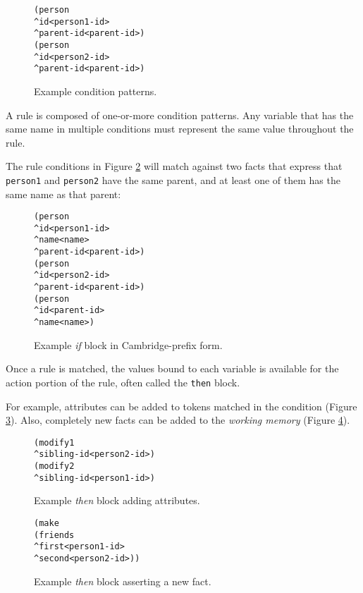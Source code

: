 \documentclass[10pt,twocolumn,letterpaper,colorhighlight]{article}
\newenvironment{codelisting}%
	{\begin{minipage}{250pt}\small\begin{alltt}}%
	{\end{alltt}\end{minipage}}
\begin{document}

	\begin{figure}
	\begin{codelisting}
	(person 
	    ^id         <person1-id>   
	    ^parent-id  <parent-id>)
	(person 
	    ^id         <person2-id>   
	    ^parent-id  <parent-id>)
	\end{codelisting}

	\caption{Example condition patterns.}
	\label{example.conditions}
	\end{figure}

A rule is composed of one-or-more condition patterns.  Any variable
that has the same name in multiple conditions must represent the same
value throughout the rule.  

The rule conditions in Figure \ref{rule.cambridge} will match against two facts that
express that \verb|person1| and \verb|person2| have the same parent,
and at least one of them has the same name as that parent:

	\begin{figure}
	\begin{codelisting}
	(person 
	    ^id         <person1-id>  
	    ^name       <name>  
	    ^parent-id  <parent-id>)
	(person 
	    ^id         <person2-id>                
	    ^parent-id  <parent-id>)
	(person 
	    ^id         <parent-id>   
	    ^name       <name>)
	\end{codelisting}

	\caption{Example \emph{if} block in Cambridge-prefix form.}
	\label{rule.cambridge}
	\end{figure}

Once a rule is matched, the values bound to each variable is available
for the action portion of the rule, often called the \verb|then|
block.

For example, attributes can be added to tokens matched in the condition
(Figure \ref{rule.cambridge.modify}).  Also, completely new facts can be
added to the \emph{working memory} (Figure \ref{rule.cambridge.make}).

	\begin{figure}[ht]
	\begin{codelisting}
	(modify 1 
	    ^sibling-id  <person2-id>)
	(modify 2 
	    ^sibling-id  <person1-id>)
	\end{codelisting}
	\caption{Example \emph{then} block adding attributes.}
	\label{rule.cambridge.modify}
	\end{figure}

	\begin{figure}[ht]
	\begin{codelisting}
	(make 
	    (friends 
	        ^first   <person1-id>
	        ^second  <person2-id>))
	\end{codelisting}
	\caption{Example \emph{then} block asserting a new fact.}
	\label{rule.cambridge.make}
	\end{figure}
\end{document}
